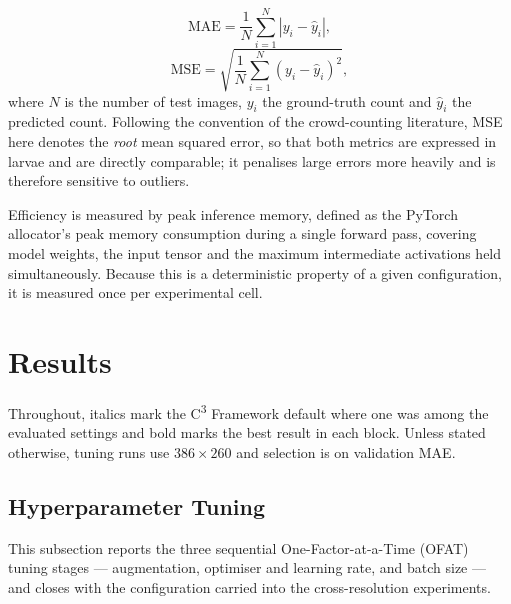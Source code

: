 \documentclass[conference]{IEEEtran}
\begin{document}
\begin{equation}
    \text{MAE} = \frac{1}{N} \sum_{i=1}^{N} \left| y_i - \hat{y}_i \right|,
    \label{eq:mae}
\end{equation}
\begin{equation}
    \text{MSE} = \sqrt{\frac{1}{N} \sum_{i=1}^{N}
    \left( y_i - \hat{y}_i \right)^2},
    \label{eq:mse}
\end{equation}
where $N$ is the number of test images, $y_i$ the ground-truth count and
$\hat{y}_i$ the predicted count. Following the convention of the crowd-counting
literature, MSE here denotes the \emph{root} mean squared error, so that both
metrics are expressed in larvae and are directly comparable; it penalises large
errors more heavily and is therefore sensitive to outliers.

Efficiency is measured by peak inference memory, defined as the PyTorch
allocator's peak memory consumption during a single forward pass, covering model
weights, the input tensor and the maximum intermediate activations held
simultaneously. Because this is a deterministic property of a given
configuration, it is measured once per experimental cell.

\section{Results}
\label{sec:results}

Throughout, italics mark the C\textsuperscript{3} Framework default where one
was among the evaluated settings and bold marks the best result in each block.
Unless stated otherwise, tuning runs use $386\times260$ and selection is on
validation MAE.

\subsection{Hyperparameter Tuning}
\label{subsec:res_tuning}

This subsection reports the three sequential One-Factor-at-a-Time (OFAT) tuning
stages --- augmentation, optimiser and learning rate, and batch size --- and
closes with the configuration carried into the cross-resolution experiments.
\end{document}

